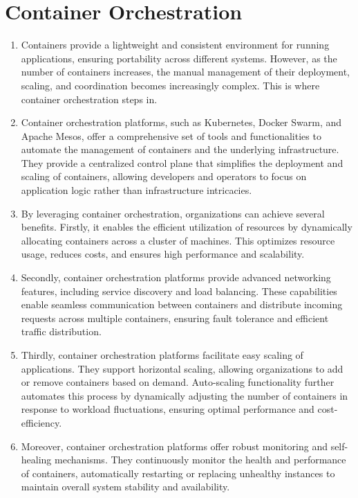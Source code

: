 \section*{Container Orchestration}

\begin{enumerate}
    \item Containers provide a lightweight and consistent environment for running applications, ensuring portability across different systems. However, as the number of containers increases, the manual management of their deployment, scaling, and coordination becomes increasingly complex. This is where container orchestration steps in.

    \item Container orchestration platforms, such as Kubernetes, Docker Swarm, and Apache Mesos, offer a comprehensive set of tools and functionalities to automate the management of containers and the underlying infrastructure. They provide a centralized control plane that simplifies the deployment and scaling of containers, allowing developers and operators to focus on application logic rather than infrastructure intricacies.

    \item By leveraging container orchestration, organizations can achieve several benefits. Firstly, it enables the efficient utilization of resources by dynamically allocating containers across a cluster of machines. This optimizes resource usage, reduces costs, and ensures high performance and scalability.

    \item Secondly, container orchestration platforms provide advanced networking features, including service discovery and load balancing. These capabilities enable seamless communication between containers and distribute incoming requests across multiple containers, ensuring fault tolerance and efficient traffic distribution.

    \item Thirdly, container orchestration platforms facilitate easy scaling of applications. They support horizontal scaling, allowing organizations to add or remove containers based on demand. Auto-scaling functionality further automates this process by dynamically adjusting the number of containers in response to workload fluctuations, ensuring optimal performance and cost-efficiency.

    \item Moreover, container orchestration platforms offer robust monitoring and self-healing mechanisms. They continuously monitor the health and performance of containers, automatically restarting or replacing unhealthy instances to maintain overall system stability and availability.


\end{enumerate}
